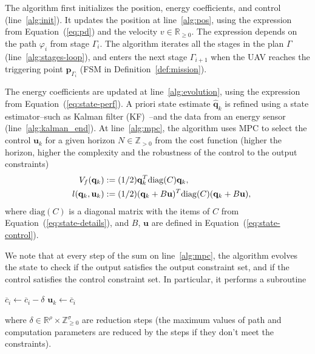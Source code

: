 \documentclass[letterpaper,10pt,conference]{ieeeconf}
\theoremstyle{definition}
\begin{document}
The algorithm first initializes the position, energy coefficients, and control (line~\ref{alg:init}). It updates the position at line~\ref{alg:pos}, using the expression from Equation~(\ref{eq:pd}) and the velocity $v\in\mathbb{R}_{\geq 0}$. The expression depends on the path $\varphi_i$ from stage $\Gamma_i$. The algorithm iterates all the stages in the plan $\Gamma$ (line~\ref{alg:stages-loop}), and enters the next stage $\Gamma_{i+1}$ when the UAV reaches the triggering point $\mathbf{p}_{\Gamma_i}$ (FSM in Definition~\ref{def:mission}).

The energy coefficients are updated at line~\ref{alg:evolution}, using the expression from Equation~(\ref{eq:state-perf}). A priori state estimate $\hat{\mathbf{q}}_k$ is refined using a state estimator--such as Kalman filter (KF)~\cite{simon2006optimal}--and the data from an energy sensor (line~\ref{alg:kalman_end}).
At line~\ref{alg:mpc}, the algorithm uses MPC to select the control $\mathbf{u}_k$ for a given horizon $N\in\mathbb{Z}_{>0}$ from the cost function (higher the horizon, higher the complexity and the robustness of the control to the output constraints)
\begin{equation}\label{eq:cost}\begin{split}
  V_f(\mathbf{q}_k)&:=(1/2)\mathbf{q}_k^T\mathrm{diag}(C)\mathbf{q}_k,\\
  l(\mathbf{q}_k,\mathbf{u}_k)&:=(1/2)(\mathbf{q}_k+B\mathbf{u})^T\mathrm{diag}(C)(\mathbf{q}_k+B\mathbf{u}),\hspace*{-2ex}
\end{split}\end{equation}
where $\mathrm{diag}(C)$ is a diagonal matrix with the items of $C$ from Equation~(\ref{eq:state-details}), and $B$, $\mathbf{u}$ are defined in Equation~(\ref{eq:state-control}).

We note that at every step of the sum on line~\ref{alg:mpc}, the algorithm evolves the state to check if the output satisfies the output constraint set, and if the control satisfies the control constraint set. In particular, it performs a subroutine
\begin{algorithmic}
  \label{alg2:while}
    \STATE $\overline{c}_i\gets\overline{c}_i-\delta$
  \ENDWHILE
  \STATE $\mathbf{u}_k\gets\overline{c}_i$
\end{algorithmic} 
where $\delta\in\mathbb{R}^\rho\times\mathbb{Z}_{\geq 0}^\sigma$ are reduction steps (the maximum values of path and computation parameters are reduced by the steps if they don't meet the constraints).
\end{document}
